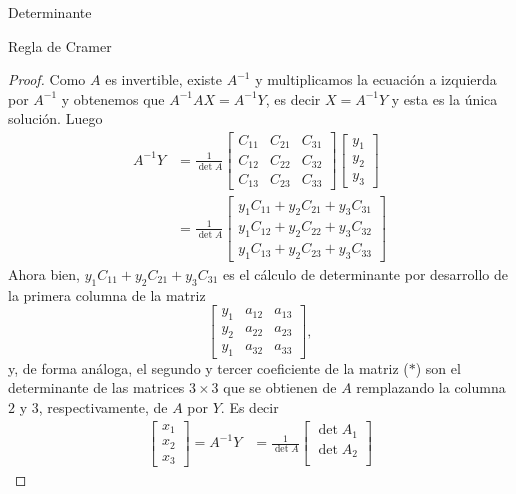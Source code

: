 \documentclass[a4paper,12pt,twoside,spanish,reqno]{amsbook}
\numberwithin{equation}{section}
\theoremstyle{definition}
\theoremstyle{remark}
\begin{document}
\begin{chapter}{Determinante}
\begin{section}{Regla de Cramer}
\begin{proof}
                 Como $A$  es invertible, existe $A^{-1}$ y multiplicamos la ecuación a izquierda por $A^{-1}$ y obtenemos que $A^{-1}A X = A^{-1}Y$,  es decir $X = A^{-1}Y$ y esta es la única solución. Luego
                 \begin{align*}
                 A^{-1}Y & = \frac{1}{\det A}
                 \begin{bmatrix} C_{11} & C_{21} & C_{31}\\
                 C_{12} & C_{22} &  C_{32} \\
                 C_{13} & C_{23} & C_{33}\end{bmatrix}
                 \begin{bmatrix} y_1 \\ y_2 \\ y_3 \end{bmatrix} \\
                 &= \frac{1}{\det A}\begin{bmatrix} y_1C_{11}+  y_2C_{21} + y_3C_{31}\\
                 y_1C_{12}+  y_2C_{22}+   y_3C_{32} \\
                 y_1C_{13}+  y_2C_{23}+  y_3C_{33}\end{bmatrix} \tag{$*$}
                 \end{align*}
                 Ahora bien,  $y_1C_{11}+  y_2C_{21}+   y_3C_{31}$ es el cálculo de determinante por desarrollo de la primera columna de la matriz 
                 $$
                 \begin{bmatrix}
                 y_1 & a_{12} & a_{13} \\y_2 & a_{22} & a_{23} \\y_1 & a_{32} & a_{33} 
                 \end{bmatrix},
                 $$
                 y,  de forma análoga, el segundo y tercer coeficiente de la matriz ($*$) son el determinante de las matrices $3 \times 3$ que se obtienen de $A$ remplazando la columna $2$ y $3$, respectivamente, de
                 $A$ por $Y$. Es decir
                 \begin{align*}
                 \begin{bmatrix} x_1\\
                 x_2 \\
                 x_3\end{bmatrix} = A^{-1}Y & = \frac{1}{\det A}\begin{bmatrix} \det A_1\\
                 \det A_2 \\

\end{bmatrix}
\end{align*}
\end{proof}
\end{section}
\end{chapter}
\end{document}
